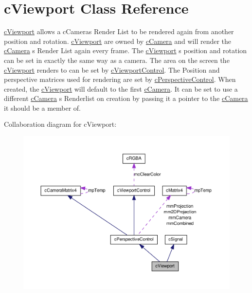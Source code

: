 \hypertarget{classc_viewport}{
\section{cViewport Class Reference}
\label{classc_viewport}
}


\hyperlink{classc_viewport}{cViewport} allows a cCameras Render List to be rendered again from another position and rotation. \hyperlink{classc_viewport}{cViewport} are owned by \hyperlink{classc_camera}{cCamera} and will render the \hyperlink{classc_camera}{cCamera} s Render List again every frame. The \hyperlink{classc_viewport}{cViewport} s position and rotation can be set in exactly the same way as a camera. The area on the screen the \hyperlink{classc_viewport}{cViewport} renders to can be set by \hyperlink{classc_viewport_control}{cViewportControl}. The Position and perspective matrices used for rendering are set by \hyperlink{classc_perspective_control}{cPerspectiveControl}. When created, the \hyperlink{classc_viewport}{cViewport} will default to the first \hyperlink{classc_camera}{cCamera}. It can be set to use a different \hyperlink{classc_camera}{cCamera} s Renderlist on creation by passing it a pointer to the \hyperlink{classc_camera}{cCamera} it should be a member of.  




Collaboration diagram for cViewport:\nopagebreak
\begin{figure}[H]
\begin{center}
\leavevmode
\includegraphics[width=400pt]{classc_viewport__coll__graph}
\end{center}
\end{figure}
